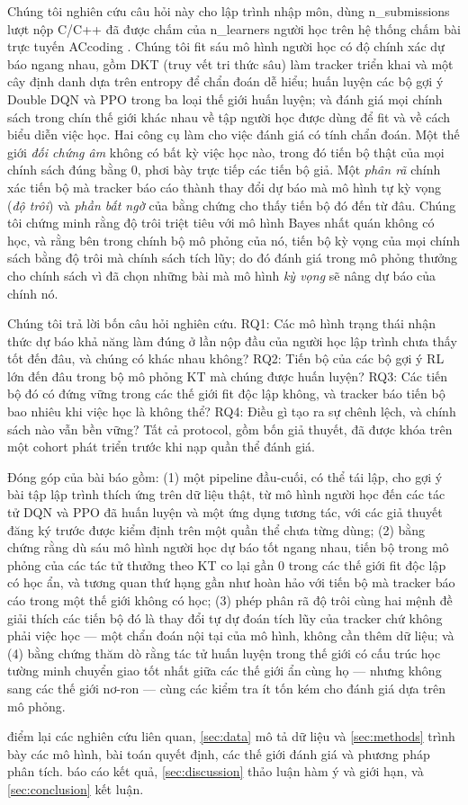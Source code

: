 Chúng tôi nghiên cứu câu hỏi này cho lập trình nhập môn, dùng {{n_submissions}} lượt nộp C/C++ đã được chấm của {{n_learners}} người học trên hệ thống chấm bài trực tuyến ACcoding \citep{chen2024accoding}. Chúng tôi fit sáu mô hình người học có độ chính xác dự báo ngang nhau, gồm DKT (truy vết tri thức sâu) làm tracker triển khai và một cây định danh dựa trên entropy để chẩn đoán dễ hiểu; huấn luyện các bộ gợi ý Double DQN và PPO trong ba loại thế giới huấn luyện; và đánh giá mọi chính sách trong chín thế giới khác nhau về tập người học được dùng để fit và về cách biểu diễn việc học. Hai công cụ làm cho việc đánh giá có tính chẩn đoán. Một thế giới \emph{đối chứng âm} không có bất kỳ việc học nào, trong đó tiến bộ thật của mọi chính sách đúng bằng 0, phơi bày trực tiếp các tiến bộ giả. Một \emph{phân rã} chính xác tiến bộ mà tracker báo cáo thành thay đổi dự báo mà mô hình tự kỳ vọng (\emph{độ trôi}) và \emph{phần bất ngờ} của bằng chứng cho thấy tiến bộ đó đến từ đâu. Chúng tôi chứng minh rằng độ trôi triệt tiêu với mô hình Bayes nhất quán không có học, và rằng bên trong chính bộ mô phỏng của nó, tiến bộ kỳ vọng của mọi chính sách bằng độ trôi mà chính sách tích lũy; do đó đánh giá trong mô phỏng thưởng cho chính sách vì đã chọn những bài mà mô hình \emph{kỳ vọng} sẽ nâng dự báo của chính nó.

Chúng tôi trả lời bốn câu hỏi nghiên cứu. RQ1: Các mô hình trạng thái nhận thức dự báo khả năng làm đúng ở lần nộp đầu của người học lập trình chưa thấy tốt đến đâu, và chúng có khác nhau không? RQ2: Tiến bộ của các bộ gợi ý RL lớn đến đâu trong bộ mô phỏng KT mà chúng được huấn luyện? RQ3: Các tiến bộ đó có đứng vững trong các thế giới fit độc lập không, và tracker báo tiến bộ bao nhiêu khi việc học là không thể? RQ4: Điều gì tạo ra sự chênh lệch, và chính sách nào vẫn bền vững? Tất cả protocol, gồm bốn giả thuyết, đã được khóa trên một cohort phát triển trước khi nạp quần thể đánh giá.

Đóng góp của bài báo gồm: (1) một pipeline đầu-cuối, có thể tái lập, cho gợi ý bài tập lập trình thích ứng trên dữ liệu thật, từ mô hình người học đến các tác tử DQN và PPO đã huấn luyện và một ứng dụng tương tác, với các giả thuyết đăng ký trước được kiểm định trên một quần thể chưa từng dùng; (2) bằng chứng rằng dù sáu mô hình người học dự báo tốt ngang nhau, tiến bộ trong mô phỏng của các tác tử thưởng theo KT co lại gần 0 trong các thế giới fit độc lập có học ẩn, và tương quan thứ hạng gần như hoàn hảo với tiến bộ mà tracker báo cáo trong một thế giới không có học; (3) phép phân rã độ trôi cùng hai mệnh đề giải thích các tiến bộ đó là thay đổi tự dự đoán tích lũy của tracker chứ không phải việc học — một chẩn đoán nội tại của mô hình, không cần thêm dữ liệu; và (4) bằng chứng thăm dò rằng tác tử huấn luyện trong thế giới có cấu trúc học tường minh chuyển giao tốt nhất giữa các thế giới ẩn cùng họ — nhưng không sang các thế giới nơ-ron — cùng các kiểm tra ít tốn kém cho đánh giá dựa trên mô phỏng.

 điểm lại các nghiên cứu liên quan, \cref{sec:data} mô tả dữ liệu và \cref{sec:methods} trình bày các mô hình, bài toán quyết định, các thế giới đánh giá và phương pháp phân tích.  báo cáo kết quả, \cref{sec:discussion} thảo luận hàm ý và giới hạn, và \cref{sec:conclusion} kết luận.
